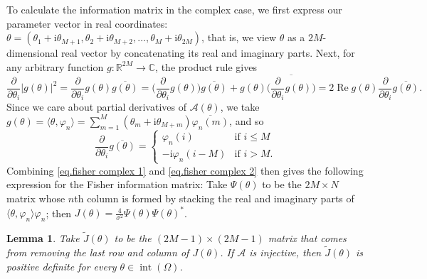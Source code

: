 \documentclass[times,10pt]{elsarticle}
\theoremstyle{plain}
\newtheorem{lemma}[theorem]{Lemma}
\begin{document}
To calculate the information matrix in the complex case, we first express our parameter vector in real coordinates: $\theta=(\theta_1+\mathrm{i}\theta_{M+1},\theta_2+\mathrm{i}\theta_{M+2},\ldots,\theta_M+\mathrm{i}\theta_{2M})$, that is, we view $\theta$ as a $2M$-dimensional real vector by concatenating its real and imaginary parts.
Next, for any arbitrary function $g\colon\mathbb{R}^{2M}\rightarrow\mathbb{C}$, the product rule gives
\begin{equation}
\label{eq.fisher complex 1}
\frac{\partial}{\partial\theta_i}|g(\theta)|^2
=\frac{\partial}{\partial\theta_i}g(\theta)\overline{g(\theta)}
=\bigg(\frac{\partial}{\partial\theta_i}g(\theta)\bigg)\overline{g(\theta)}+g(\theta)\overline{\bigg(\frac{\partial}{\partial\theta_i}g(\theta)\bigg)}
=2\operatorname{Re}g(\theta)\frac{\partial}{\partial\theta_i}\overline{g(\theta)}.
\end{equation}
Since we care about partial derivatives of $\mathcal{A}(\theta)$, we take $g(\theta)=\langle\theta,\varphi_n\rangle=\sum_{m=1}^M(\theta_m+\mathrm{i}\theta_{M+m})\overline{\varphi_n(m)}$, and so 
\begin{equation}
\label{eq.fisher complex 2}
\frac{\partial}{\partial\theta_i}\overline{g(\theta)}
=\left\{
\begin{array}{cl}
\varphi_n(i) &\mbox{if } i\leq M\\
-\mathrm{i}\varphi_n(i-M) &\mbox{if } i>M.
\end{array}
\right.
\end{equation}
Combining \eqref{eq.fisher complex 1} and \eqref{eq.fisher complex 2} then gives the following expression for the Fisher information matrix:
Take $\Psi(\theta)$ to be the $2M\times N$ matrix whose $n$th column is formed by stacking the real and imaginary parts of $\langle\theta,\varphi_n\rangle \varphi_n$; then $J(\theta)=\frac{4}{\sigma^2}\Psi(\theta)\Psi(\theta)^*$.

\begin{lemma}
\label{lemma.J is invertible}
Take $\widetilde{J}(\theta)$ to be the $(2M-1)\times(2M-1)$ matrix that comes from removing the last row and column of $J(\theta)$.
If $\mathcal{A}$ is injective, then $\widetilde{J}(\theta)$ is positive definite for every $\theta\in\operatorname{int}(\Omega)$.
\end{lemma}
\end{document}
